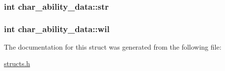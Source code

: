 \hypertarget{structchar__ability__data_a03590f60ecee188342000a9c2480863d}{
\subsubsection[{str}]{\setlength{\rightskip}{0pt plus 5cm}int char\-\_\-ability\-\_\-data\-::str}}\label{structchar__ability__data_a03590f60ecee188342000a9c2480863d}
\hypertarget{structchar__ability__data_a5a723a48b64cefe5b478ff8bbd20e61f}{
\subsubsection[{wil}]{\setlength{\rightskip}{0pt plus 5cm}int char\-\_\-ability\-\_\-data\-::wil}}\label{structchar__ability__data_a5a723a48b64cefe5b478ff8bbd20e61f}


The documentation for this struct was generated from the following file\-:\begin{DoxyCompactItemize}
\item 
\hyperlink{structs_8h}{structs.\-h}\end{DoxyCompactItemize}
